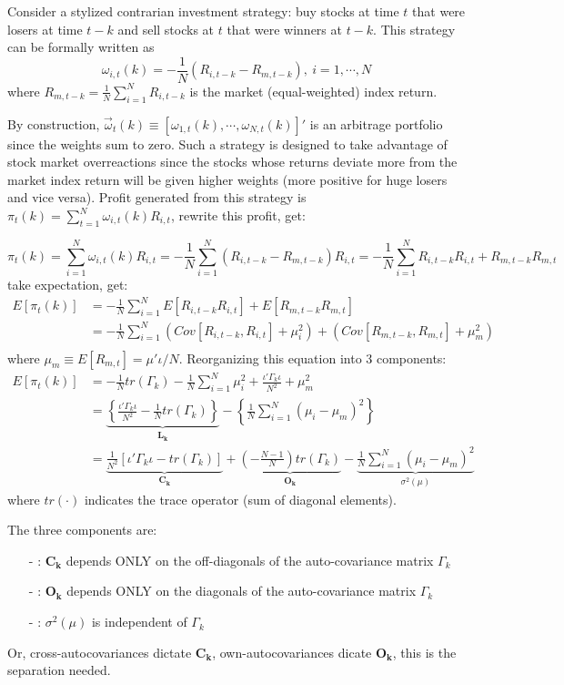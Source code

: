 Consider a stylized contrarian investment strategy: buy stocks at time $t$ that were losers at time $t-k$ and sell 
stocks at $t$ that were winners at $t-k$. This strategy can be formally written as 
$$
\omega_{i,t}(k)=-\frac{1}{N}(R_{i,t-k}-R_{m,t-k}),\ i=1,\cdots,N
$$
where $R_{m,t-k}=\frac{1}{N}\sum^N_{i=1}R_{i,t-k}$ is the market (equal-weighted) index return.

By construction, $\vec{\omega}_{t}(k)\equiv \left[\omega_{1,t}(k),\cdots,\omega_{N,t}(k)\right]'$ is an arbitrage portfolio 
since the weights sum to zero. Such a strategy is designed to take advantage of stock market overreactions since the stocks
whose returns deviate more from the market index return will be given higher weights (more positive for huge losers and 
vice versa). Profit generated from this strategy is $\pi_t(k)=\sum^N_{t=1}\omega_{i,t}(k)R_{i,t}$, rewrite this profit, get:

$$
\pi_t(k)= \sum^N_{i=1}\omega_{i,t}(k)R_{i,t}= -\frac{1}{N}\sum^N_{i=1}\left(R_{i,t-k}-R_{m,t-k}\right)R_{i,t} = -\frac{1}{N}\sum^N_{i=1}R_{i,t-k}R_{i,t}+R_{m,t-k}R_{m,t}
$$
take expectation, get:
\begin{align*}
    E[\pi_t(k)] &= -\frac{1}{N}\sum^N_{i=1} E\left[R_{i,t-k}R_{i,t}\right]+E\left[R_{m,t-k}R_{m,t}\right]\\
    &= -\frac{1}{N}\sum^N_{i=1}\left(Cov\left[R_{i,t-k},R_{i,t}\right] +\mu_i^2 \right) + \left(Cov\left[R_{m,t-k},R_{m,t}\right] +\mu_m^2 \right)\\
\end{align*}
where $\mu_m\equiv E\left[R_{m,t}\right]=\mu'\iota/N$. Reorganizing this equation into 3 components:
\begin{align}
    E[\pi_t(k)] &= -\frac{1}{N}tr(\Gamma_k) -\frac{1}{N}\sum^N_{i=1}\mu_i^2+\frac{\iota'\Gamma_k\iota}{N^2}+\mu_m^2 \nonumber \\
    & = \underbrace{\left\{\frac{\iota'\Gamma_k\iota}{N^2} -\frac{1}{N} tr(\Gamma_k) \right\}}_{\mathbf{L_k}}- \left\{\frac{1}{N}\sum^N_{i=1}(\mu_i-\mu_m)^2\right\} \nonumber \\
    & = \underbrace{\frac{1}{N^2}\left[\iota'\Gamma_k\iota-tr(\Gamma_k)\right]}_{\mathbf{C_k}} + \underbrace{\left(-\frac{N-1}{N}\right)tr(\Gamma_k)}_{\mathbf{O_k}} - \underbrace{\frac{1}{N}\sum^N_{i=1}(\mu_i-\mu_m)^2}_{\sigma^2(\mu)} \label{eq1.7}
\end{align}
where $tr(\cdot)$ indicates the trace operator (sum of diagonal elements).

The three components are:
\begin{enumerate}
    \item[-]: $\mathbf{C_k}$ depends ONLY on the off-diagonals of the auto-covariance matrix $\Gamma_k$
    \item[-]: $\mathbf{O_k}$ depends ONLY on the diagonals of the auto-covariance matrix $\Gamma_k$
    \item[-]: $\sigma^2(\mu)$ is independent of $\Gamma_k$
\end{enumerate}
Or, cross-autocovariances dictate $\mathbf{C_k}$, own-autocovariances dicate $\mathbf{O_k}$, this is the separation needed.

